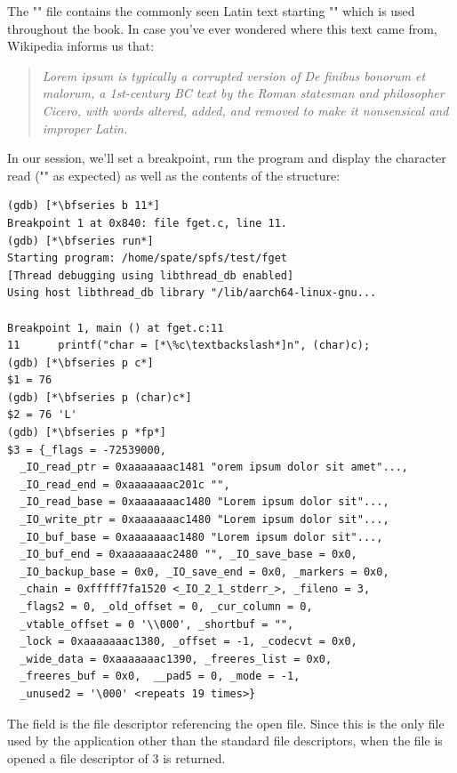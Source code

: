 \noindent
The "" file contains the commonly seen Latin text starting "" which is used throughout the book. In case you've ever wondered where this text came from, Wikipedia informs us that:

\begin{quote}
\textit{Lorem ipsum is typically a corrupted version of De finibus bonorum et malorum, a 1st-century BC text by the Roman statesman and philosopher Cicero, with words altered, added, and removed to make it nonsensical and improper Latin.}
\end{quote}

\noindent
In our  session, we'll set a breakpoint, run the program and display the character read ("" as expected) as well as the contents of the  structure:

\begin{lstlisting}
(gdb) [*\bfseries b 11*]
Breakpoint 1 at 0x840: file fget.c, line 11.
(gdb) [*\bfseries run*]
Starting program: /home/spate/spfs/test/fget 
[Thread debugging using libthread_db enabled]
Using host libthread_db library "/lib/aarch64-linux-gnu...
	
Breakpoint 1, main () at fget.c:11
11		printf("char = [*\%c\textbackslash*]n", (char)c);
(gdb) [*\bfseries p c*]
$1 = 76
(gdb) [*\bfseries p (char)c*]
$2 = 76 'L'
(gdb) [*\bfseries p *fp*]
$3 = {_flags = -72539000, 
  _IO_read_ptr = 0xaaaaaaac1481 "orem ipsum dolor sit amet"..., 
  _IO_read_end = 0xaaaaaaac201c "", 
  _IO_read_base = 0xaaaaaaac1480 "Lorem ipsum dolor sit"..., 
  _IO_write_ptr = 0xaaaaaaac1480 "Lorem ipsum dolor sit"..., 
  _IO_buf_base = 0xaaaaaaac1480 "Lorem ipsum dolor sit"..., 
  _IO_buf_end = 0xaaaaaaac2480 "", _IO_save_base = 0x0, 
  _IO_backup_base = 0x0, _IO_save_end = 0x0, _markers = 0x0, 
  _chain = 0xfffff7fa1520 <_IO_2_1_stderr_>, _fileno = 3, 
  _flags2 = 0, _old_offset = 0, _cur_column = 0, 
  _vtable_offset = 0 '\\000', _shortbuf = "",  
  _lock = 0xaaaaaaac1380, _offset = -1, _codecvt = 0x0, 
  _wide_data = 0xaaaaaaac1390, _freeres_list = 0x0, 
  _freeres_buf = 0x0,  __pad5 = 0, _mode = -1, 
  _unused2 = '\000' <repeats 19 times>}
\end{lstlisting}

\noindent
The  field is the file descriptor referencing the open file. Since this is the only file used by the application other than the standard file descriptors, when the file is opened a file descriptor of 3 is returned.

